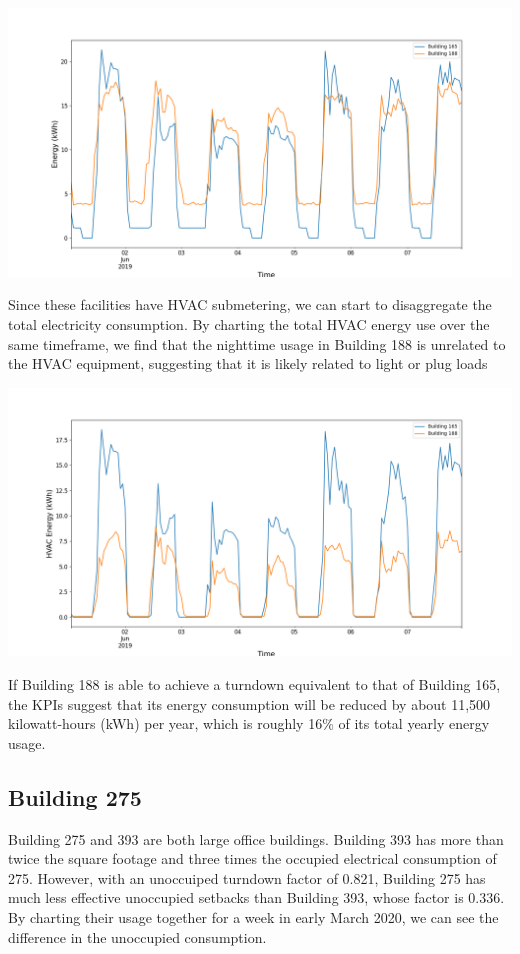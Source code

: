 \documentclass[a4paper]{article}
\begin{document}
\includegraphics[width=.8\columnwidth]{./images/188v165_Turndown.png}

Since these facilities have HVAC submetering, we can start to disaggregate the total electricity consumption. By charting the total HVAC energy use over the same timeframe, we find that the nighttime usage in Building 188 is unrelated to the HVAC equipment, suggesting that it is likely related to light or plug loads

\includegraphics[width=.8\columnwidth]{./images/188v165_Turndown_HVAC.png}

If Building 188 is able to achieve a turndown equivalent to that of Building 165, the KPIs suggest that its energy consumption will be reduced by about 11,500 kilowatt-hours (kWh) per year, which is roughly 16\% of its total yearly energy usage.

\subsection{Building 275}

Building 275 and 393 are both large office buildings. Building 393 has more than twice the square footage and three times the occupied electrical consumption of 275. However, with an unoccuiped turndown factor of 0.821, Building 275 has much less effective unoccupied setbacks than Building 393, whose factor is 0.336. By charting their usage together for a week in early March 2020, we can see the difference in the unoccupied consumption.
\end{document}
